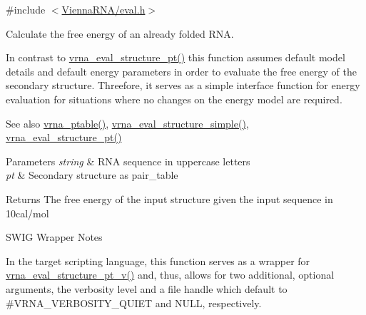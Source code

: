 {\ttfamily \#include $<$\hyperlink{eval_8h}{Vienna\+R\+N\+A/eval.\+h}$>$}



Calculate the free energy of an already folded R\+NA. 

In contrast to \hyperlink{group__eval_gadbd09372ddfd7a450bbd590c96a6bfe4}{vrna\+\_\+eval\+\_\+structure\+\_\+pt()} this function assumes default model details and default energy parameters in order to evaluate the free energy of the secondary structure. Threefore, it serves as a simple interface function for energy evaluation for situations where no changes on the energy model are required.

\begin{DoxySeeAlso}{See also}
\hyperlink{group__struct__utils_gae829fb8bb7f694c12a9c0bbc34c77c60}{vrna\+\_\+ptable()}, \hyperlink{group__eval_ga7e5273464b775d4130245681312c1369}{vrna\+\_\+eval\+\_\+structure\+\_\+simple()}, \hyperlink{group__eval_gadbd09372ddfd7a450bbd590c96a6bfe4}{vrna\+\_\+eval\+\_\+structure\+\_\+pt()}
\end{DoxySeeAlso}

\begin{DoxyParams}{Parameters}
{\em string} & R\+NA sequence in uppercase letters \\
\hline
{\em pt} & Secondary structure as pair\+\_\+table \\
\hline
\end{DoxyParams}
\begin{DoxyReturn}{Returns}
The free energy of the input structure given the input sequence in 10cal/mol
\end{DoxyReturn}
\begin{DoxyRefDesc}{S\+W\+I\+G Wrapper Notes}
\item[\hyperlink{wrappers__wrappers000053}{S\+W\+I\+G Wrapper Notes}]In the target scripting language, this function serves as a wrapper for \hyperlink{group__eval_ga2c6533ba0afe4c88d335d8f1e0e2a48e}{vrna\+\_\+eval\+\_\+structure\+\_\+pt\+\_\+v()} and, thus, allows for two additional, optional arguments, the verbosity level and a file handle which default to \#\+V\+R\+N\+A\+\_\+\+V\+E\+R\+B\+O\+S\+I\+T\+Y\+\_\+\+Q\+U\+I\+ET and N\+U\+LL, respectively. \end{DoxyRefDesc}
\mbox{\label{group__eval_ga76e152ee9a02be23da14cdddf52b4e44}} 
